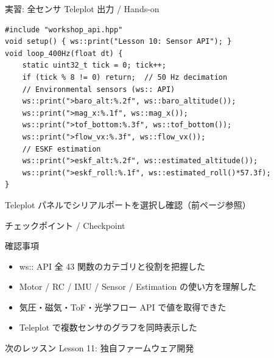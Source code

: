\documentclass[aspectratio=169, 14pt]{beamer}
\begin{document}
\begin{frame}[fragile]{実習: 全センサ Teleplot 出力 / Hands-on}
  \begin{lstlisting}[style=sfcpp, basicstyle=\ttfamily\scriptsize]
#include "workshop_api.hpp"
void setup() { ws::print("Lesson 10: Sensor API"); }
void loop_400Hz(float dt) {
    static uint32_t tick = 0; tick++;
    if (tick % 8 != 0) return;  // 50 Hz decimation
    // Environmental sensors (ws:: API)
    ws::print(">baro_alt:%.2f", ws::baro_altitude());
    ws::print(">mag_x:%.1f", ws::mag_x());
    ws::print(">tof_bottom:%.3f", ws::tof_bottom());
    ws::print(">flow_vx:%.3f", ws::flow_vx());
    // ESKF estimation
    ws::print(">eskf_alt:%.2f", ws::estimated_altitude());
    ws::print(">eskf_roll:%.1f", ws::estimated_roll()*57.3f);
}
  \end{lstlisting}

  \vspace{0.2em}
  {\footnotesize
    Teleplot パネルでシリアルポートを選択し確認（前ページ参照）
  }
\end{frame}

\begin{frame}{チェックポイント / Checkpoint}
  \begin{alertblock}{確認事項}
    \begin{itemize}
      \item[$\square$] ws:: API 全 43 関数のカテゴリと役割を把握した
      \item[$\square$] Motor / RC / IMU / Sensor / Estimation の使い方を理解した
      \item[$\square$] 気圧・磁気・ToF・光学フロー API で値を取得できた
      \item[$\square$] Teleplot で複数センサのグラフを同時表示した
    \end{itemize}
  \end{alertblock}

  \vspace{0.5em}

  \begin{block}{次のレッスン}
    Lesson 11: 独自ファームウェア開発
  \end{block}
\end{frame}
\end{document}
